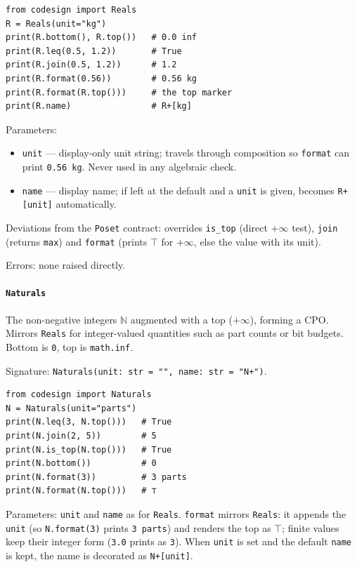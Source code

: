 \documentclass[11pt,a4paper]{article}
\newcommand{\Nat}{\mathbb{N}}
\newcommand{\topp}{\top}
\begin{document}
\begin{lstlisting}
from codesign import Reals
R = Reals(unit="kg")
print(R.bottom(), R.top())   # 0.0 inf
print(R.leq(0.5, 1.2))       # True
print(R.join(0.5, 1.2))      # 1.2
print(R.format(0.56))        # 0.56 kg
print(R.format(R.top()))     # the top marker
print(R.name)                # R+[kg]
\end{lstlisting}

Parameters:
\begin{itemize}[nosep]
\item \texttt{unit} --- display-only unit string; travels through
  composition so \texttt{format} can print \texttt{0.56 kg}. Never used
  in any algebraic check.
\item \texttt{name} --- display name; if left at the default and a
  \texttt{unit} is given, becomes \texttt{R+[unit]} automatically.
\end{itemize}

Deviations from the \texttt{Poset} contract: overrides \texttt{is\_top}
(direct $+\infty$ test), \texttt{join} (returns \texttt{max}) and
\texttt{format} (prints $\topp$ for $+\infty$, else the value
with its unit).

Errors: none raised directly.

\paragraph{\texttt{Naturals}}
\label{ref:posets:naturals}
The non-negative integers $\Nat$ augmented with a top ($+\infty$), forming
a CPO. Mirrors \texttt{Reals} for integer-valued quantities such as part
counts or bit budgets. Bottom is \texttt{0}, top is \texttt{math.inf}.

Signature: \texttt{Naturals(unit: str = "", name: str = "N+")}.

\begin{lstlisting}
from codesign import Naturals
N = Naturals(unit="parts")
print(N.leq(3, N.top()))   # True
print(N.join(2, 5))        # 5
print(N.is_top(N.top()))   # True
print(N.bottom())          # 0
print(N.format(3))         # 3 parts
print(N.format(N.top()))   # ⊤
\end{lstlisting}

Parameters: \texttt{unit} and \texttt{name} as for \texttt{Reals}.
\texttt{format} mirrors \texttt{Reals}: it appends the \texttt{unit} (so
\texttt{N.format(3)} prints \texttt{3 parts}) and renders the top as
$\top$; finite values keep their integer form (\texttt{3.0} prints as
\texttt{3}). When \texttt{unit} is set and the default \texttt{name} is
kept, the name is decorated as \texttt{N+[unit]}.
\end{document}
